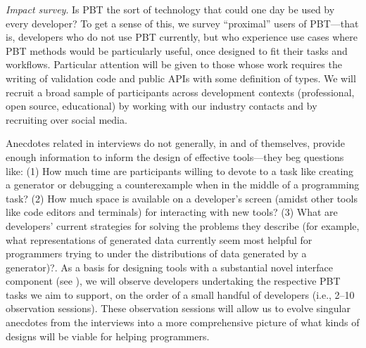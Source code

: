 \emph{Impact survey}. Is PBT the sort of
technology that could one day be used by every developer? To get a
sense of this, we survey ``proximal'' users of PBT---that is,
developers who do not use PBT currently, but who experience
use cases where PBT methods would be particularly useful,
once designed to fit their tasks and workflows. Particular
attention will be given to those whose work requires the
writing of validation code and public APIs with some
definition of types. We will recruit a broad sample of
participants across development contexts (professional, open
source, educational) by working with our industry contacts
and by recruiting over social media. 


Anecdotes related in interviews do not generally, in and of
themselves, provide enough information to inform the design of
effective tools---they beg questions like: (1) How much time
are participants willing to devote to
a task like creating a generator or debugging a counterexample when in the
middle of a programming task? (2) How much space is available on a developer's
screen (amidst other tools like code editors and terminals) for
interacting with new
tools? (3) What are developers' current strategies for solving the
problems they describe
(for example, what representations of generated data currently seem most helpful
for programmers trying to under the distributions of data generated by a
generator)?.  As a basis for designing tools with a substantial novel interface
component (see ), we will observe developers
undertaking the respective PBT tasks we
aim to support, on the order of a small handful of developers (i.e., 2--10
observation sessions). These observation sessions will allow us to evolve
singular anecdotes from the interviews into a more comprehensive picture of
what kinds of designs will be viable for helping programmers.

